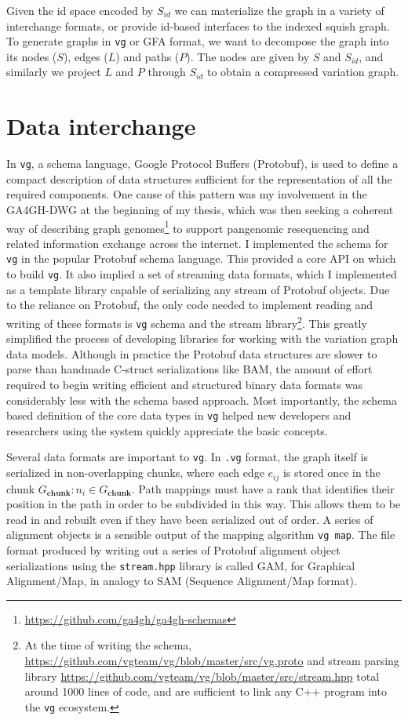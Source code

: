 \documentclass[a4paper,12pt,numbered,oneside]{Classes/PhDThesisPSnPDF}
\begin{document}
Given the id space encoded by $S_{id}$ we can materialize the graph in a variety of interchange formats, or provide id-based interfaces to the indexed squish graph.
To generate graphs in {\tt vg} or GFA format, we want to decompose the graph into its nodes ($S$), edges ($L$) and paths ($P$).
The nodes are given by $S$ and $S_{id}$, and similarly we project $L$ and $P$ through $S_{id}$ to obtain a compressed variation graph.


\section{Data interchange}

In {\tt vg}, a schema language, Google Protocol Buffers (Protobuf), is used to define a compact description of data structures sufficient for the representation of all the required components.
One cause of this pattern was my involvement in the GA4GH-DWG at the beginning of my thesis, which was then seeking a coherent way of describing graph genomes\footnote{\url{https://github.com/ga4gh/ga4gh-schemas}} to support pangenomic resequencing and related information exchange across the internet.
I implemented the schema for {\tt vg} in the popular Protobuf schema language.
This provided a core API on which to build {\tt vg}.
It also implied a set of streaming data formats, which I implemented as a template library capable of serializing any stream of Protobuf objects.
Due to the reliance on Protobuf, the only code needed to implement reading and writing of these formats is {\tt vg} schema and the stream library\footnote{At the time of writing the schema, \url{https://github.com/vgteam/vg/blob/master/src/vg.proto} and stream parsing library \url{https://github.com/vgteam/vg/blob/master/src/stream.hpp} total around 1000 lines of code, and are sufficient to link any C++ program into the {\tt vg} ecosystem.}.
This greatly simplified the process of developing libraries for working with the variation graph data models.
Although in practice the Protobuf data structures are slower to parse than handmade C-struct serializations like BAM, the amount of effort required to begin writing efficient and structured binary data formats was considerably less with the schema based approach.
Most importantly, the schema based definition of the core data types in {\tt vg} helped new developers and researchers using the system quickly appreciate the basic concepts.

Several data formats are important to {\tt vg}.
In {\tt .vg} format, the graph itself is serialized in non-overlapping chunks, where each edge $e_{ij}$ is stored once in the chunk $G_\textbf{chunk} : n_i \in G_\textbf{chunk}$.
Path mappings must have a rank that identifies their position in the path in order to be subdivided in this way.
This allows them to be read in and rebuilt even if they have been serialized out of order.
A series of alignment objects is a sensible output of the mapping algorithm {\tt vg map}.
The file format produced by writing out a series of Protobuf alignment object serializations using the {\tt stream.hpp} library is called GAM, for Graphical Alignment/Map, in analogy to SAM (Sequence Alignment/Map format).
\end{document}

